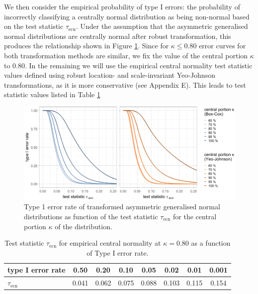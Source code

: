 \documentclass[preprint,12pt,authoryear]{elsarticle}
\begin{document}
We then consider the empirical probability of type I errors: the
probability of incorrectly classifying a centrally normal distribution
as being non-normal based on the test statistic \(\tau_{\text{ecn}}\).
Under the assumption that the asymmetric generalised normal
distributions are centrally normal after robust transformation, this
produces the relationship shown in Figure
\ref{fig:empirical-central-normality-type-1-error-rate}. Since for
\(\kappa \leq 0.80\) error curves for both transformation methods are
similar, we fix the value of the central portion \(\kappa\) to 0.80. In
the remaining we will use the empirical central normality test statistic
values defined using robust location- and scale-invariant Yeo-Johnson
transformations, as it is more conservative (see Appendix E). This leads
to test statistic values listed in Table
\ref{tab:empirical-central-normality}

\begin{figure}

{\centering \includegraphics{figure_6} 

}

\caption{Type 1 error rate of transformed asymmetric generalised normal distributions as function of the test statistic $\tau_{\text{ecn}}$ for the central portion $\kappa$ of the distribution.}\label{fig:empirical-central-normality-type-1-error-rate}
\end{figure}

\begin{table}
\begin{center}
\caption{Test statistic $\tau_{\text{ecn}}$ for empirical central normality at $\kappa = 0.80$ as a function of Type I error rate.}
\label{tab:empirical-central-normality}
\begin{tabular}{l | c c c c c c c}

\toprule
type I error rate & 0.50 & 0.20 & 0.10 & 0.05 & 0.02 & 0.01 & 0.001 \\

\midrule
$\tau_{\text{ecn}}$ & 0.041 & 0.062 & 0.075 & 0.088 & 0.103 & 0.115 & 0.154 \\
\bottomrule
\end{tabular}
\end{center}
\end{table}
\end{document}
